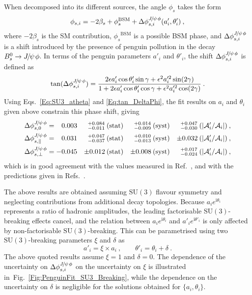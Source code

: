 \documentclass[12pt,a4paper]{article}
\def\grpsuthree {{\ensuremath{\mathrm{SU}(3)}}\xspace}
\def\PJ      {\ensuremath{J}\xspace}
\def\Ppsi {\ensuremath{\psi}\xspace}
\def\jpsi     {{\ensuremath{{\PJ\mskip -3mu/\mskip -2mu\Ppsi\mskip 2mu}}}\xspace}
\newcommand{\BsJpsiPhi}{\ensuremath{B^0_s\to \jpsi \phi}\xspace}
\newcommand{\phis}{\ensuremath{\phi_s}\xspace}
\newcommand{\figref}[1]{Fig.~\ref{#1}}
\begin{document}
When decomposed into its different sources, the angle \phis takes the form
\begin{equation}
\phi_{s,i} = -2\beta_s + \phis^{\text{BSM}} + \Delta\phi^{\jpsi{}\phi}_{s,i}(a'_i, \theta'_i)\:,
\end{equation}
where $-2\beta_s$ is the SM contribution, $\phis^{\text{BSM}}$ is a possible BSM phase, and $\Delta\phi^{\jpsi{}\phi}_{s,i}$ is a shift introduced by the presence of penguin pollution in the decay $\BsJpsiPhi$.
In terms of the penguin parameters $a'_i$ and $\theta'_i$, the shift $\Delta\phi^{\jpsi{}\phi}_{s,i}$ is defined as
\begin{equation}\label{Eq:tan_DeltaPhi}
\tan(\Delta\phi^{\jpsi{}\phi}_{s,i}) = \frac{2\epsilon a'_i \cos\theta'_i \sin\gamma+\epsilon^2 a^{\prime 2}_i \sin(2\gamma)}{1+2\epsilon a'_i \cos\theta'_i \cos\gamma+ \epsilon^2 a^{\prime 2}_i \cos(2\gamma)}\:.
\end{equation}
Using Eqs.~\ref{Eq:SU3_atheta} and \ref{Eq:tan_DeltaPhi}, the fit results on $a_i$ and $\theta_i$ given above constrain this phase shift, giving
\begin{alignat*}{4}
\Delta\phi^{\jpsi{}\phi}_{s,0} & = 
\phantom{-}0.003 & ^{+0.084}_{-0.011} & \:\text{(stat)} & ^{+0.014}_{-0.009} & \:\text{(syst)} & ^{+0.047}_{-0.030} &\:(|\mathcal{A}'_i/\mathcal{A}_i|)\:,\\
\Delta\phi^{\jpsi{}\phi}_{s,\parallel} & =
\phantom{-}0.031 & ^{+0.047}_{-0.037} & \:\text{(stat)} & ^{+0.010}_{-0.013} & \:\text{(syst)} & \pm 0.032 & \:(|\mathcal{A}'_i/\mathcal{A}_i|)\:,\\
\Delta\phi^{\jpsi{}\phi}_{s,\perp} & =
-0.045 & \pm 0.012 & \:\text{(stat)} & \pm 0.008 & \:\text{(syst)} & ^{+0.017}_{-0.024} & \:(|\mathcal{A}'_i/\mathcal{A}_i|)\:,
\end{alignat*}
which is in good agreement with the values measured in Ref.~\cite{LHCb-PAPER-2014-058}, and with the
predictions given in Refs.~\cite{DeBruyn:2014oga, Liu:2013nea, Frings:2015eva}.

The above results are obtained assuming \grpsuthree flavour symmetry and neglecting contributions from additional decay topologies.
Because $a_i e^{\text{i}\theta_i}$ represents a ratio of hadronic amplitudes, the leading factorisable \grpsuthree-breaking effects cancel, and the relation between $a_i e^{\text{i}\theta_i}$ and $a'_i e^{\text{i}\theta'_i}$ is only affected by non-factorisable \grpsuthree-breaking.
This can be parametrised using two \grpsuthree-breaking parameters $\xi$ and $\delta$ as
\begin{equation}
a'_i = \xi \times a_i\:,\qquad \theta'_i = \theta_i + \delta\:.
\end{equation}
The above quoted results assume $\xi = 1$ and $\delta = 0$.
The dependence of the uncertainty on $\Delta\phi_{s,i}^{\jpsi\phi}$ on the uncertainty on $\xi$ is illustrated in~\figref{Fig:PenguinFit_SU3_Breaking}, while the dependence on the uncertainty on $\delta$ is negligible for the solutions obtained for $\{a_i,\theta_i\}$.
\end{document}
